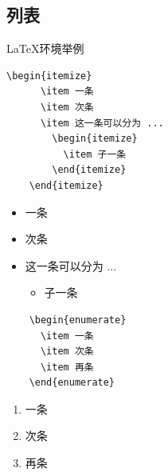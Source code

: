 \subsection{列表}
\begin{frame}[fragile]{\LaTeX 环境举例}
    \vspace{1em}
      \begin{minipage}{0.4\linewidth}
        \begin{lstlisting}[basicstyle=\ttfamily\small]
    \begin{itemize}
      \item 一条
      \item 次条
      \item 这一条可以分为 ...
        \begin{itemize}
          \item 子一条
        \end{itemize}
    \end{itemize}\end{lstlisting}
      \end{minipage}\hspace{1.5cm}
      \begin{minipage}{0.4\linewidth}
    \begin{itemize}
      \item 一条
      \item 次条
      \item 这一条可以分为 ...
        \begin{itemize}
          \item 子一条
        \end{itemize}
    \end{itemize}
      \end{minipage}
    
    \begin{minipage}{0.4\linewidth}
    \begin{lstlisting}
    \begin{enumerate}
      \item 一条
      \item 次条
      \item 再条
    \end{enumerate}\end{lstlisting}
      \end{minipage}\hspace{1.5cm}
      \begin{minipage}{0.4\linewidth}
        \vspace{-1cm}
    \begin{enumerate}
      \item 一条
      \item 次条
      \item 再条
    \end{enumerate}
      \end{minipage}
    \end{frame}
    
